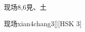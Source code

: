\begin{entry}{现场}{8,6}{⾒、⼟}
  \begin{phonetics}{现场}{xian4chang3}[][HSK 3]
  \end{phonetics}
\end{entry}
